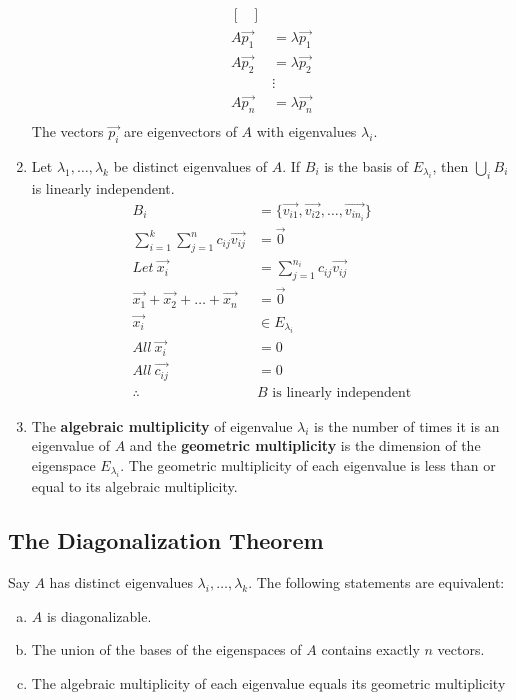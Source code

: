 \documentclass{math}
\begin{document}
\begin{enumerate}[{Theorem} 1:]
\begin{align*}
\begin{bmatrix}
    \end{bmatrix} \\
    A\vec{p_1} &= \lambda\vec{p_1} \\
    A\vec{p_2} &= \lambda\vec{p_2} \\
    &\vdots \\
    A\vec{p_n} &= \lambda\vec{p_n} \\
  \end{align*}
  The vectors \( \vec{p_i} \) are eigenvectors of \( A \) with eigenvalues
  \( \lambda_i \).
  \item Let \( \lambda_1,\dots,\lambda_k \) be distinct eigenvalues of \( A \).
  If \( B_i \) is the basis of \( E_{\lambda_i} \), then \( \bigcup_iB_i \) is
  linearly independent.
  \begin{align*}
    B_i &= \{\vec{v_{i1}},\vec{v_{i2}},\dots,\vec{v_{in_i}}\} \\
    \sum_{i=1}^{k}\sum_{j=1}^{n}c_{ij}\vec{v_{ij}} &= \vec{0} \\
    Let~\vec{x_i} &= \sum_{j=1}^{n_i}c_{ij}\vec{v_{ij}} \\
    \vec{x_1}+\vec{x_2}+\dots+\vec{x_n} &= \vec{0} \\
    \vec{x_i}&\in E_{\lambda_i} \\
    All~\vec{x_i} &= 0 \\
    All~\vec{c_{ij}} &= 0 \\
    \therefore \quad & B\text{ is linearly independent}
  \end{align*}
  \item The \textbf{algebraic multiplicity} of eigenvalue \( \lambda_i \) is
  the number of times it is an eigenvalue of \( A \) and the \textbf{geometric
  multiplicity} is the dimension of the eigenspace \( E_{\lambda_i} \). The
  geometric multiplicity of each eigenvalue is less than or equal to its
  algebraic multiplicity.
\end{enumerate}

\subsection*{The Diagonalization Theorem}
Say \( A \) has distinct eigenvalues \( \lambda_i,\dots,\lambda_k \). The
following statements are equivalent:
\begin{enumerate}[(a)]
  \item \( A \) is diagonalizable.
  \item The union of the bases of the eigenspaces of \( A \) contains exactly
  \( n \) vectors.
  \item The algebraic multiplicity of each eigenvalue equals its geometric
  multiplicity
\end{enumerate}
\end{document}
